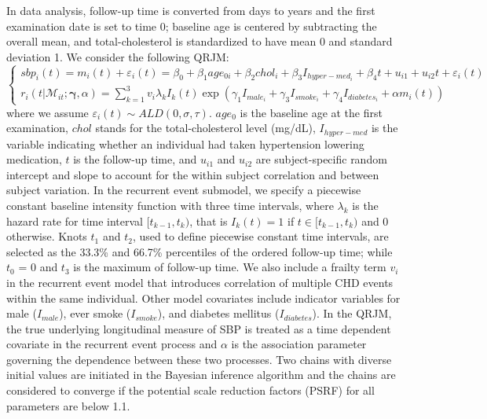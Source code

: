 In data analysis, follow-up time is converted from days to years and the first examination date is set to time 0; baseline age is centered by subtracting the overall mean, and total-cholesterol is standardized to have mean 0 and standard deviation 1. We consider the following QRJM:
\small{
\begin{equation*}\label{eqn:p2data_joint}
\left\{
\begin{array}{l}
sbp_{i}(t) = m_{i}(t) + \varepsilon_{i}(t) = \beta_0 + \beta_1 age_{0i} + \beta_2 chol_i + \beta_3 I_{hyper-med_i}+ \beta_4 t + {u}_{i1} + u_{i2} t + \varepsilon_{i}(t)\\
r_i(t|\mathcal{M}_{it};  \boldsymbol{\gamma}, \alpha) = \sum_{k=1}^3v_i\lambda_kI_k(t)\exp(\gamma_1 I_{male_i} + \gamma_3 I_{smoke_i} + \gamma_4I_{diabetes_i} + \alpha m_i(t))
\end{array}
\right.
\end{equation*}
}
where we assume  $\varepsilon_{i}(t)\sim ALD(0, \sigma, \tau)$. $age_0$ is the baseline age at the first examination, $chol$ stands for the total-cholesterol level (mg/dL), $I_{hyper-med}$ is the variable indicating whether an individual had taken hypertension lowering medication, $t$ is the follow-up time, and $u_{i1}$ and $u_{i2}$ are subject-specific random intercept and slope to account for the within subject correlation and between subject variation. In the recurrent event submodel, we specify a piecewise constant baseline intensity function with three time intervals, where $\lambda_k$ is the hazard rate for time interval $[t_{k-1}, t_{k})$, that is $I_k(t)=1$ if $t\in[t_{k-1}, t_{k})$ and 0 otherwise. Knots $t_1$ and $t_2$, used to define piecewise constant time intervals, are selected as the 33.3\% and 66.7\% percentiles of the ordered follow-up time; while $t_0$ = 0 and $t_3$ is the maximum of follow-up time. We also include a frailty term $v_i$ in the recurrent event model that introduces correlation of multiple CHD events within the same individual. Other model covariates include indicator variables for male ($I_{male}$), ever smoke ($I_{smoke}$), and diabetes mellitus ($I_{diabetes}$). In the QRJM, the true underlying longitudinal measure of SBP is treated as a time dependent covariate in the recurrent event process and $\alpha$ is the association parameter governing the dependence between these two processes. Two chains with diverse initial values are initiated in the Bayesian inference algorithm and the chains are considered to converge if the potential scale reduction factors (PSRF) for all parameters are below 1.1.


